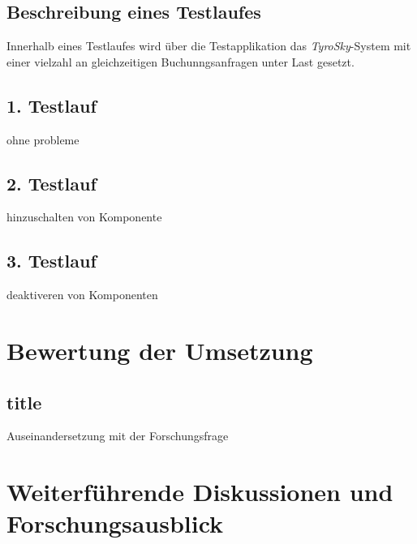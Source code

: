 \subsection{Beschreibung eines Testlaufes}
Innerhalb eines Testlaufes wird über die Testapplikation das \textit{TyroSky}-System mit einer vielzahl an gleichzeitigen Buchunngsanfragen unter Last gesetzt. 


\subsection{1. Testlauf}
ohne probleme

\subsection{2. Testlauf}
hinzuschalten von Komponente

\subsection{3. Testlauf}
deaktiveren von Komponenten

\section{Bewertung der Umsetzung}\label{cha:rating}

\subsection{title}{Auseinandersetzung mit der Forschungsfrage}

\section{Weiterführende Diskussionen und Forschungsausblick}
 